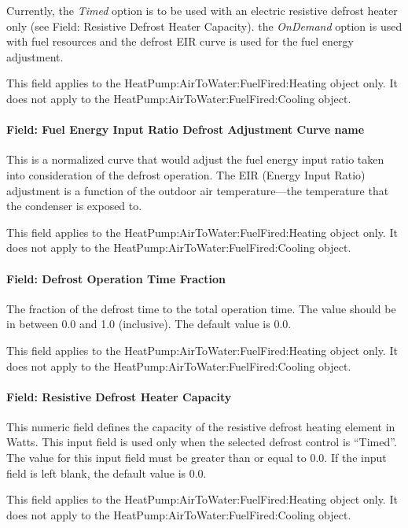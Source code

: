 Currently, the \emph{Timed} option is to be used with an electric resistive defrost heater only (see Field: Resistive Defrost Heater Capacity). the \emph{OnDemand} option is used with fuel resources and the defrost EIR curve is used for the fuel energy adjustment.

This field applies to the HeatPump:AirToWater:FuelFired:Heating object only. It does not apply to the HeatPump:AirToWater:FuelFired:Cooling object.

\paragraph{Field: Fuel Energy Input Ratio Defrost Adjustment Curve name}

This is a normalized curve that would adjust the fuel energy input ratio taken into consideration of the defrost operation. The EIR (Energy Input Ratio) adjustment is a function of the outdoor air temperature---the temperature that the condenser is exposed to.

This field applies to the HeatPump:AirToWater:FuelFired:Heating object only. It does not apply to the HeatPump:AirToWater:FuelFired:Cooling object.

\paragraph{Field: Defrost Operation Time Fraction}

The fraction of the defrost time to the total operation time. The value should be in between 0.0 and 1.0 (inclusive). The default value is 0.0.

This field applies to the HeatPump:AirToWater:FuelFired:Heating object only. It does not apply to the HeatPump:AirToWater:FuelFired:Cooling object.

\paragraph{Field: Resistive Defrost Heater Capacity}

This numeric field defines the capacity of the resistive defrost heating element in Watts. This input field is used only when the selected defrost control is ``Timed''. The value for this input field must be greater than or equal to 0.0. If the input field is left blank, the default value is 0.0.

This field applies to the HeatPump:AirToWater:FuelFired:Heating object only. It does not apply to the HeatPump:AirToWater:FuelFired:Cooling object.

